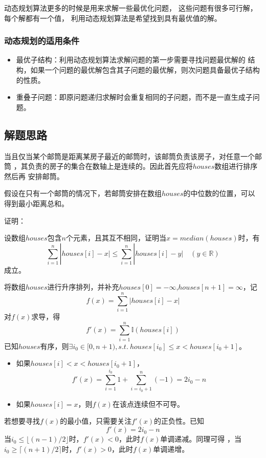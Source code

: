 \documentclass[12pt, a4paper, oneside]{ctexart}
\begin{document}
动态规划算法更多的时候是用来求解一些最优化问题，
这些问题有很多可行解，每个解都有一个值，
利用动态规划算法是希望找到具有最优值的解。

\subsubsection{动态规划的适用条件}
\begin{itemize}
    \item 最优子结构：利用动态规划算法求解问题的第一步需要寻找问题最优解的
    结构，如果一个问题的最优解包含其子问题的最优解，则次问题具备最优子结构的性质。
    \item 重叠子问题：即原问题递归求解时会重复相同的子问题，而不是一直生成子问题。
\end{itemize}

\subsection{解题思路}
当且仅当某个邮筒是距离某房子最近的邮筒时，该邮筒负责该房子，对任意一个邮筒
，其负责的房子的集合在数轴上是连续的。因此首先应将$houses$数组进行排序然后再
安排邮筒。

假设在只有一个邮筒的情况下，若邮筒安排在数组$houses$的中位数的位置，可以得到最小距离总和。

证明：

设数组$houses$包含$n$个元素，且其互不相同，证明当$x = median(houses)$时，有
$$
\sum_{i=1}^{n}| houses[i] - x\vert \leq \sum_{i=1}^{n}| houses[i] - y\vert \quad (y \in \mathbb{R})
$$
成立。

将数组$houses$进行升序排列，并补充$houses[0] = -\infty $,$houses[n+1] = \infty$，记
$$
f(x) = \sum_{i=1}^{n}| houses[i] - x\vert
$$
对$f(x)$求导，得
$$
f'(x) = \sum_{i=1}^{n} \mathbb{I}(houses[i])
$$
已知$houses$有序，则$\exists i_{0} \in [0, n+1),s.t. \ houses[i_{0}] \leq x < houses[i_{0} + 1]$。
\begin{itemize}
    \item 如果$houses[i] < x < houses[i_{0} + 1]$，
    $$f'(x) = \sum_{i = 1}^{i_{0}}1 + \sum_{i = i_{0} + 1}^{n}(-1)=2i_{0} - n$$
    \item 如果$houses[i] = x$，则$f(x)$在该点连续但不可导。
\end{itemize}
若想要寻找$f(x)$的最小值，只需要关注$f'(x)$的正负性。已知
$$
f'(x) = 2i_{0} - n
$$
当$i_{0} \leq \lfloor (n-1)/2\rfloor $时，$f'(x) < 0$，此时$f(x)$单调递减。同理可得
，当$i_{0} \geq \lceil (n+1)/2\rceil $时，$f'(x) > 0$，此时$f(x)$单调递增。
\end{document}
